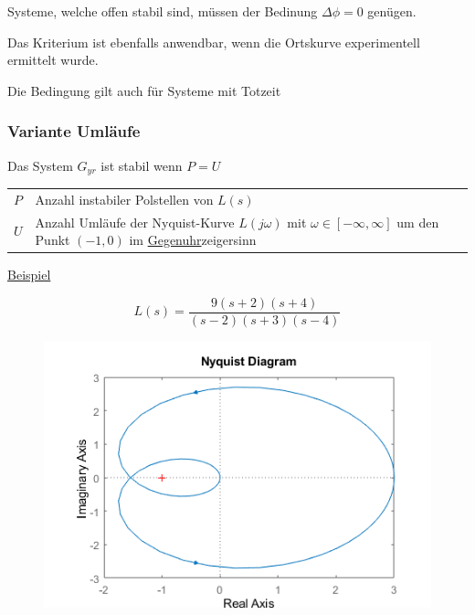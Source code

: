 \documentclass[
  10pt,
  a4paper,
]{article}
\makeatletter
\numberwithin{equation}{section}
\newenvironment{conditions}
  {\par\vspace{\abovedisplayskip}\noindent\begin{tabular}{>{$}l<{$} @{${}:{}$} l}}
  {\end{tabular}\par\vspace{\belowdisplayskip}}
\makeatother
\begin{document}
\begin{multicols}{2}
\begin{tcolorbox}
Systeme, welche offen stabil sind, müssen der Bedinung \(\Delta\phi=0\)
genügen.

Das Kriterium ist ebenfalls anwendbar, wenn die Ortskurve experimentell
ermittelt wurde.

\end{tcolorbox}

\begin{tcolorbox}[enhanced jigsaw, coltitle=black, arc=.35mm, breakable, opacityback=0, opacitybacktitle=0.6, rightrule=.15mm, titlerule=0mm, bottomrule=.15mm, leftrule=.75mm, bottomtitle=1mm, colframe=quarto-callout-note-color-frame, toprule=.15mm, colbacktitle=quarto-callout-note-color!10!white, toptitle=1mm, title=\textcolor{quarto-callout-note-color}{\faInfo}\hspace{0.5em}{Totzeit}, left=2mm, colback=white]

Die Bedingung gilt auch für Systeme mit Totzeit

\end{tcolorbox}

\hypertarget{variante-umluxe4ufe}{%
\subsubsection{Variante Umläufe}\label{variante-umluxe4ufe}}

Das System \(G_{yr}\) ist stabil wenn \(P=U\)

\begin{conditions}
  P & Anzahl instabiler Polstellen von $L(s)$ \\
  U & Anzahl Umläufe der Nyquist-Kurve $L(j\omega)$ mit $\omega\in [-\infty,\infty]$ um den Punkt $(-1,0)$ im \underline{Gegenuhr}zeigersinn
\end{conditions}

\ul{Beispiel}

\[
L(s)=\frac{9(s+2)(s+4)}{(s-2)(s+3)(s-4)}
\]

\begin{figure}[H]

{\centering \includegraphics{images/paste-5.png}

}
\end{figure}
\end{multicols}
\end{document}
